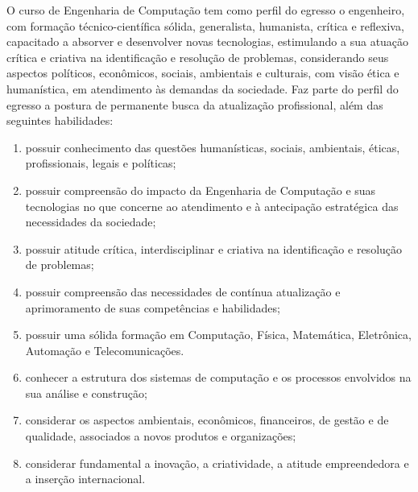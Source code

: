O curso de Engenharia de Computação tem como perfil do egresso o engenheiro, com formação técnico-científica sólida, generalista, humanista, crítica e reflexiva, capacitado a absorver e desenvolver novas tecnologias, estimulando a sua atuação crítica e criativa na identificação e resolução de problemas, considerando seus aspectos políticos, econômicos, sociais, ambientais e culturais, com visão ética e humanística, em atendimento às demandas da sociedade. Faz parte do perfil do egresso a postura de permanente busca da atualização profissional, além das seguintes habilidades:
\begin{enumerate} [I -]
	\item possuir conhecimento das questões humanísticas, sociais, ambientais, éticas, profissionais, legais e políticas;
	\item possuir compreensão do impacto da Engenharia de Computação e suas tecnologias no que concerne ao atendimento e à antecipação estratégica das necessidades da sociedade;
	\item possuir atitude crítica, interdisciplinar e criativa na identificação e resolução de problemas;
	\item possuir compreensão das necessidades de contínua atualização e aprimoramento de suas competências e habilidades;
	\item possuir uma sólida formação em Computação, Física, Matemática, Eletrônica, Automação e Telecomunicações.
	\item conhecer a estrutura dos sistemas de computação e os processos envolvidos na sua análise e construção;
	\item considerar os aspectos ambientais, econômicos, financeiros, de gestão e de qualidade, associados a novos produtos e organizações;
	\item considerar fundamental a inovação, a criatividade, a atitude empreendedora e a inserção internacional.
\end{enumerate}

